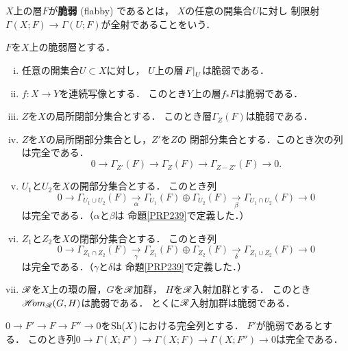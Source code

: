 \begin{DFN}\label{DFN245}
    \(X\)上の層\(F\)が\textbf{脆弱} (flabby) であるとは，
    \(X\)の任意の開集合\(U\)に対し
    制限射\(\Gamma(X;F)\to\Gamma(U;F)\)が全射であることをいう．
\end{DFN}

\begin{leftbar}
\begin{PRP}\label{PRP246}
    \(F\)を\(X\)上の脆弱層とする．
    \begin{enumerate}[(i)]
        \item 任意の開集合\(U\subset X\)に対し，
        \(U\)上の層\(\mres[F]{U}\)は脆弱である．
        \item \(f\colon X\to Y\)を連続写像とする．
        このとき\(Y\)上の層\(f_{\ast}F\)は脆弱である．
        \item \(Z\)を\(X\)の局所閉部分集合とする．
        このとき層\(\Gamma_{Z}(F)\)は脆弱である．
        \item \(Z\)を\(X\)の局所閉部分集合とし，\(Z'\)を\(Z\)の
        閉部分集合とする．このとき次の列は完全である．\[
            0\to \Gamma_{Z'}(F)
            \to \Gamma_{Z}(F)
            \to \Gamma_{Z-Z'}(F)\to0.
        \]
        \item \(U_1\)と\(U_2\)を\(X\)の開部分集合とする．
        このとき列\[
            0\to \Gamma_{U_1\cup U_2}(F)\underset{\alpha}{\to}
            \Gamma_{U_1}(F)\oplus \Gamma_{U_2}(F)\underset{\beta}{\to}
            \Gamma_{U_1\cap U_2}(F)\to0
        \]は完全である．（\(\alpha\)と\(\beta\)は
        命題\ref{PRP239}で定義した．）
        \item \(Z_1\)と\(Z_2\)を\(X\)の閉部分集合とする．
        このとき列\[
            0\to \Gamma_{Z_1\cap Z_2}(F)\underset{\gamma}{\to}
            \Gamma_{Z_1}(F)\oplus \Gamma_{Z_2}(F)\underset{\delta}{\to}
            \Gamma_{Z_1\cup Z_2}(F)\to0
        \]は完全である．（\(\gamma\)と\(\delta\)は
        命題\ref{PRP239}で定義した．）
        \item \(\scR\)を\(X\)上の環の層，\(G\)を\(\scR\)加群，
        \(H\)を\(\scR\)入射加群とする．
        このとき\(\HOM_{\scR}(G,H)\)は脆弱である．
        とくに\(\scR\)入射加群は脆弱である．
    \end{enumerate}
\end{PRP}
\end{leftbar}

\begin{leftbar}
\begin{PRP}\label{PRP247}
    \(0\to F'\to F\to F''\to0\)を\(\Sh(X)\)における完全列とする．
    \(F'\)が脆弱であるとする．
    このとき列\(
        0\to\Gamma(X;F')\to\Gamma(X;F)\to\Gamma(X;F'')\to0
    \)は完全である．
\end{PRP}
\end{leftbar}

